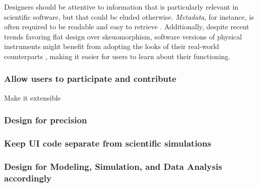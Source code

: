 Designers should be attentive to information that is particularly relevant in scientific software, but that could be eluded otherwise. \emph{Metadata}, for instance, is often required to be readable and easy to retrieve  \cite{Talbott:2005, Baxter:2006, Macaulay:2009, Keefe:2010, DeMatos:2013, bestprSC, Thomer:2016}. Additionally, despite recent trends favoring flat design over skeuomorphism, software versions of physical instruments might benefit from adopting the looks of their real-world counterparts \cite{Foster:1998}, making it easier for users to learn about their functioning.   



\subsubsection{Allow users to participate and contribute} Make it extensible

\subsubsection{Design for precision}

\subsubsection{Keep UI code separate from scientific simulations}

\subsubsection{Design for Modeling, Simulation, and Data Analysis accordingly}

